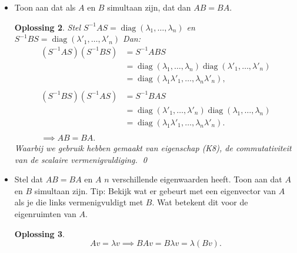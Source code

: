 \documentclass[a4paper,12pt]{article}
\newtheorem{oplossing}{Oplossing}
\begin{document}
\begin{enumerate}
\begin{itemize}
\begin{oplossing}
        Hier is
        \(
        AB = \begin{pmatrix}
            0 & 0 \\
            1 & 0
        \end{pmatrix}
        \)
        en
        \(
        BA = \begin{pmatrix}
            -1 & 1 \\
            -1 & 1
        \end{pmatrix}
        \)

        Dus \(AB \neq BA\).
    \end{oplossing}
    \item[(ii)] Toon aan dat als $A$ en $B$ simultaan zijn, dat dan $AB = BA$.
    \begin{oplossing}
        Stel \(S^{-1} A S = \operatorname{diag}(\lambda_1,\dots,\lambda_n)\) en \(S^{-1} B S = \operatorname{diag}(\lambda'_1,\dots,\lambda'_n)\)
        Dan:
        \begin{align*}
            (S^{-1} A S)(S^{-1} B S)
            &= S^{-1} AB S\\
            &=  \operatorname{diag}(\lambda_1,\dots,\lambda_n)  \operatorname{diag}(\lambda'_1,\dots,\lambda'_n)\\
            &= \operatorname{diag}(\lambda_1\lambda'_1,\dots,\lambda_n\lambda'_n),\\
            \\
            (S^{-1} B S)(S^{-1} A S)
            &= S^{-1} BA S\\
            &=  \operatorname{diag}(\lambda'_1,\dots,\lambda'_n)  \operatorname{diag}(\lambda_1,\dots,\lambda_n)\\
            &= \operatorname{diag}(\lambda_1\lambda'_1,\dots,\lambda_n\lambda'_n). \\
            \\
            \implies AB=BA.
        \end{align*}
        Waarbij we gebruik hebben gemaakt van eigenschap (K8), de commutativiteit van de scalaire vermenigvuldiging. \qed
    \end{oplossing}
    \item[(iii)] Stel dat $AB = BA$ en $A$ $n$ verschillende eigenwaarden heeft. Toon aan dat $A$ en $B$ simultaan zijn. Tip: Bekijk wat er gebeurt met een eigenvector van $A$ als je die links vermenigvuldigt met $B$. Wat betekent dit voor de eigenruimten van $A$.
     \begin{oplossing}
        \[A v = \lambda v \implies BAv = B\lambda v = \lambda (Bv). \]

\end{oplossing}
\end{itemize}
\end{enumerate}
\end{document}
